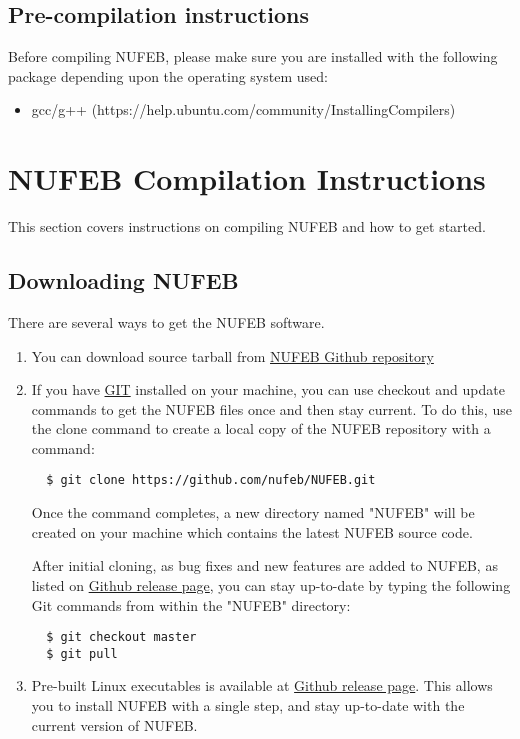 \documentclass[11pt,a4paper,openright]{article}
\begin{document}
\subsection{Pre-compilation instructions}

Before compiling NUFEB, please make sure you are installed with the following package depending upon the operating system used:
\begin{itemize}
\item gcc/g++ (https://help.ubuntu.com/community/InstallingCompilers)
\end{itemize} 

\section{NUFEB Compilation Instructions}
This section covers instructions on compiling NUFEB and how to get started. 

\subsection{Downloading NUFEB}
There are several ways to get the NUFEB software.

\begin{enumerate}
\item You can download source tarball from \href{https://github.com/nufeb/NUFEB}{NUFEB Github repository}
\item If you have \href{https://git-scm.com/}{GIT} installed on your machine, you can use checkout and update commands to get the NUFEB files once and then stay current. To do this, use the clone command to create a local copy of the NUFEB repository with a command: 

\begin{verbatim}
  $ git clone https://github.com/nufeb/NUFEB.git
\end{verbatim}

Once the command completes, a new directory named "NUFEB" will be created on your machine which contains the latest NUFEB source code. 

After initial cloning, as bug fixes and new features are added to NUFEB, as listed on \href{https://github.com/nufeb/NUFEB/releases}{Github release page}, you can stay up-to-date by typing the following Git commands from within the "NUFEB" directory: 

\begin{verbatim}
  $ git checkout master
  $ git pull
\end{verbatim}

\item Pre-built Linux executables is available at \href{https://github.com/nufeb/NUFEB/releases}{Github release page}. This allows you to install NUFEB with a single step, and stay up-to-date with the current version of NUFEB.

\end{enumerate}
\end{document}
